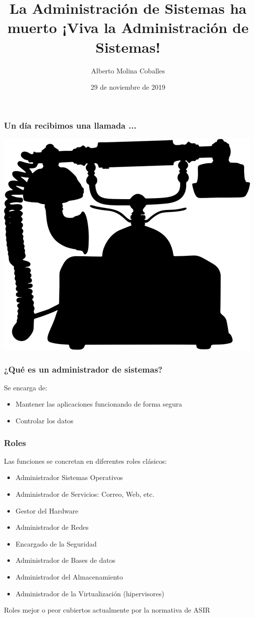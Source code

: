 \documentclass[aspectratio=169]{beamer}
\author{Alberto Molina Coballes}
\title{La Administración de Sistemas ha muerto ¡Viva la Administración de Sistemas!}
\institute{IES Gonzalo Nazareno}
\date{29 de noviembre de 2019}
\begin{document}
\def\braces#1{[#1]}

\begin{frame}[t,plain]
\titlepage
\end{frame}

\begin{frame}
  \frametitle{Un día recibimos una llamada ...}
  \begin{center}
    \includegraphics[width=.6\textwidth]{img/Vintage-Telephone-Silhouette.png}
  \end{center}
\end{frame}

\begin{frame}
  \frametitle{¿Qué es un administrador de sistemas?}
  Se encarga de:
  \begin{itemize}
  \item Mantener las aplicaciones funcionando de forma segura
  \item Controlar los datos
  \end{itemize}
\end{frame}

\begin{frame}
  \frametitle{Roles}
  Las funciones se concretan en diferentes roles clásicos:
  \begin{itemize}
  \item Administrador Sistemas Operativos
  \item Administrador de Servicios: Correo, Web, etc.
  \item Gestor del Hardware
  \item Administrador de Redes
  \item Encargado de la Seguridad
  \item Administrador de Bases de datos
  \item Administrador del Almacenamiento
  \item Administrador de la Virtualización (hipervisores)
  \end{itemize}
  Roles mejor o peor cubiertos actualmente por la normativa de ASIR
\end{frame}
\end{document}
